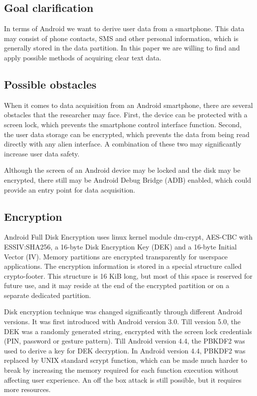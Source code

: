 \subsection{Goal clarification}

In terms of Android we want to derive user data from a smartphone. This data may consist of phone contacts, SMS and other personal information, which is generally stored in the data partition. In this paper we are willing to find and apply possible methods of acquiring clear text data.

\subsection{Possible obstacles}

When it comes to data acquisition from an Android smartphone, there are several obstacles that the researcher may face. First, the device can be protected with a screen lock, which prevents the smartphone control interface function. Second, the user data storage can be encrypted, which prevents the data from being read directly with any alien interface. A combination of these two may significantly increase user data safety. 

Although the screen of an Android device may be locked and the disk may be encrypted, there still may be Android Debug Bridge (ADB) enabled, which could provide an entry point for data acquisition.

\subsection{Encryption}

Android Full Disk Encryption uses linux kernel module dm-crypt, AES-CBC with ESSIV:SHA256, a 16-byte Disk Encryption Key (DEK) and a 16-byte Initial Vector (IV). Memory partitions are encrypted transparently for userspace applications. The encryption information is stored in a special structure called crypto-footer. This structure is 16 KiB long, but most of this space is reserved for future use, and it may reside at the end of the encrypted partition or on a separate dedicated partition. 

Disk encryption technique was changed significantly through different Android versions. It was first introduced with Android version 3.0. Till version 5.0, the DEK was a randomly generated string, encrypted with the screen lock credentials (PIN, password or gesture pattern). Till Android version 4.4, the PBKDF2 was used to derive a key for DEK decryption. In Android version 4.4, PBKDF2 was replaced by UNIX standard scrypt function, which can be made much harder to break by increasing the memory required for each function execution without affecting user experience. An off the box attack is still possible, but it requires more resources. 

